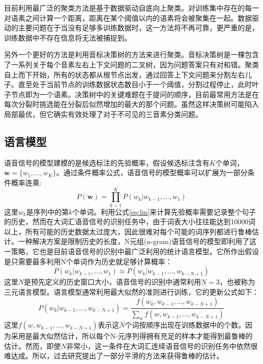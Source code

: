 目前利用最广泛的聚类方法是基于数据驱动自底向上聚类。对训练集中存在的每一对语素之间计算一个距离，距离在某个阈值以内的语素将会被聚集在一起。数据驱动的主要问题在于当没有足够多训练数据时，这一方法将不再可靠，更严重的是，训练数据中不存在信息将无法被捕捉到。

另外一个更好的方法是利用音标决策树的方法来进行聚类。音标决策树是一棵包含了一系列关于每个音素左右上下文问题的二叉树，因为问题答案只有对和错。聚类自上而下开始，所有的状态都从根节点出发，通过回答上下文问题来分割左右儿子。直至处于当前节点的训练数据状态数目小于一个阈值，分割过程停止，此时叶子节点即为一个语素。决策树中的关键难题在于提问的顺序，目前最常用方法是在每次分裂时挑选能在分裂后似然增加的最大的那个问题。虽然这样决策树可能陷入局部最优，但它确实有效处理了对于不可见的三音素分类问题。

\subsection{语言模型}
\label{sec:lm}
语音信号的模型建模的是候选标注的先验概率，假设候选标注含有$K$个单词，$\mathbf{w}=\{w_1, \dots, w_K\}$。通过条件概率公式，语音信号的模型概率可以扩展为一部分条件概率连乘:
\begin{equation}
    \label{eq:lm}
    P(\mathbf{w})=\prod_{k=1}^{K}P(w_k|w_{k-1}, ..., w_1)
\end{equation}
这里$w_k$是序列中的第$k$个单词。利用公式\ref{eq:lm}来计算先验概率需要记录整个句子的历史，然而在大词汇语音信号的识别任务中，由于词表大小往往能达到10000词以上，所有可能的历史数据太过庞大，因此很难对每个可能的词序列都进行鲁棒估计。一种解决方案是限制历史的长度，N元组(n-gram)语音信号的模型即利用了这一策略，它也是目前语音信号的识别中最广泛利用的统计语言模型。它所作出假设是只需要最多利用N个单词作为历史就足够计算概率：
\begin{equation}
    P(w_k|w_{k-1}, ..., w_1) \approx P(w_k|w_{k-1}, ..., w_{k-N+1})
\end{equation}
这里$N$是预先定义的历史窗口大小，语音信号的识别中通常利用$N=3$，也被称为三元语言模型。语言模型通常利用最大似然的准则进行训练，它的更新公式如下：
\begin{equation}
    P(w_k|w_{k-1}, ..., w_{k-N+1})=\frac{f(w_k,w_{k-1},...,w_{k-N+1})}{\sum_wf(w,w_{k-1},...,w_{k-N+1})}
\end{equation}
这里$f(w,w_{k-1},...,w_{k-N+1})$表示这$N$个词按顺序出现在训练数据中的个数。因为采用是最大似然估计，所以每个N-元序列得拥有充足的样本才能得到最鲁棒的估计。然而，即使$N$非常小，这一条件在大词汇连续语音信号的识别任务中依然很难达成。所以，过去研究提出了一部分平滑的方法来获得鲁棒的估计。
